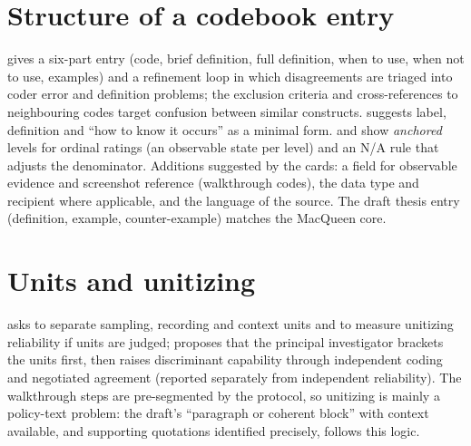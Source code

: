 \section{Structure of a codebook entry}
 gives a six-part entry (code, brief definition, full definition, when to use, when not to use, examples) and a refinement loop in which disagreements are triaged into coder error and definition problems; the exclusion criteria and cross-references to neighbouring codes target confusion between similar constructs.  suggests label, definition and ``how to know it occurs'' as a minimal form.  and  show \emph{anchored} levels for ordinal ratings (an observable state per level) and an N/A rule that adjusts the denominator. Additions suggested by the cards: a field for observable evidence and screenshot reference (walkthrough codes), the data type and recipient where applicable, and the language of the source. The draft thesis entry (definition, example, counter-example) matches the MacQueen core.

\section{Units and unitizing}
 asks to separate sampling, recording and context units and to measure unitizing reliability if units are judged;  proposes that the principal investigator brackets the units first, then raises discriminant capability through independent coding and negotiated agreement (reported separately from independent reliability). The walkthrough steps are pre-segmented by the protocol, so unitizing is mainly a policy-text problem: the draft's ``paragraph or coherent block'' with context available, and supporting quotations identified precisely, follows this logic.

